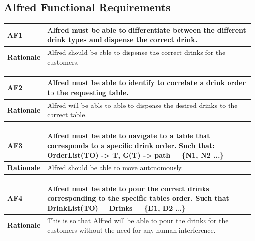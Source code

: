 \documentclass [11pt]{article}
\begin{document}
\subsection{Alfred Functional Requirements}

\begin{longtable}{| p{ } | p{ } | }\hline 
\rowcolor{tableCell}\textbf{AF1} & Alfred must be able to differentiate between the different drink types and dispense the correct drink.\\ \hline
\textbf{Rationale} & Alfred should be able to dispense the correct drinks for the customers.\\ \hline 
\end{longtable}

\begin{longtable}{| p{ } | p{ } | }\hline 
\rowcolor{tableCell}\textbf{AF2} & Alfred must be able to identify to correlate a drink order to the requesting table.\\ \hline
\textbf{Rationale} &  Alfred will be able to able to dispense the desired drinks to the correct table.\\ \hline 
\end{longtable}

\begin{longtable}{| p{ } | p{ } | }\hline 
\rowcolor{tableCell}\textbf{AF3} &  Alfred must be able to navigate to a table that corresponds to a specific drink order. Such that: OrderList(TO) -> T, G(T) -> path = \{N1, N2 ...\}\\ \hline
\textbf{Rationale} & Alfred should be able to move autonomously.  \\ \hline 
\end{longtable}

\begin{longtable}{| p{ } | p{ } | }\hline 
\rowcolor{tableCell}\textbf{AF4} & Alfred must be able to pour the correct drinks corresponding to the specific tables order. Such that: DrinkList(TO) = Drinks = \{D1, D2 ...\} \\ \hline
\textbf{Rationale} &  This is so that Alfred will be able to pour the drinks for the customers without the need for any human interference. \\ \hline 
\end{longtable}
\end{document}
